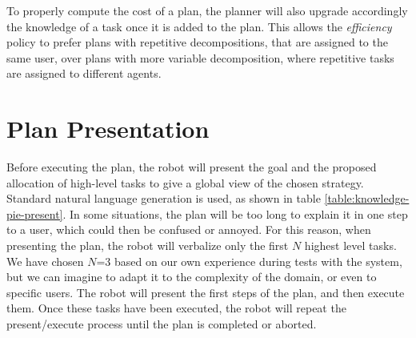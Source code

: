 To properly compute the cost of a plan, the planner will also upgrade accordingly the knowledge of a task once it is added to the plan. This allows the \textit{efficiency} policy to prefer plans with repetitive decompositions, that are assigned to the same user, over plans with more variable decomposition, where repetitive tasks are assigned to different agents.



\section{Plan Presentation}
\label{sec:knowledge-plan_presentation}
Before executing the plan, the robot will present the goal and the proposed allocation of high-level tasks to give a global view of the chosen strategy. Standard natural language generation is used, as shown in table \ref{table:knowledge-pie-present}. 
In some situations, the plan will be too long to explain it in one step to a user, which could then be confused or annoyed. For this reason, when presenting the plan, the robot will verbalize only the first $N$  highest level tasks. We have chosen $N$=$3$ based on our own experience during tests with the system, but we can imagine to adapt it to the complexity of the domain, or even to specific users. The robot will present the first steps of the plan, and then execute them. Once these tasks have been executed, the robot will repeat the present/execute process until the plan is completed or aborted.
 
